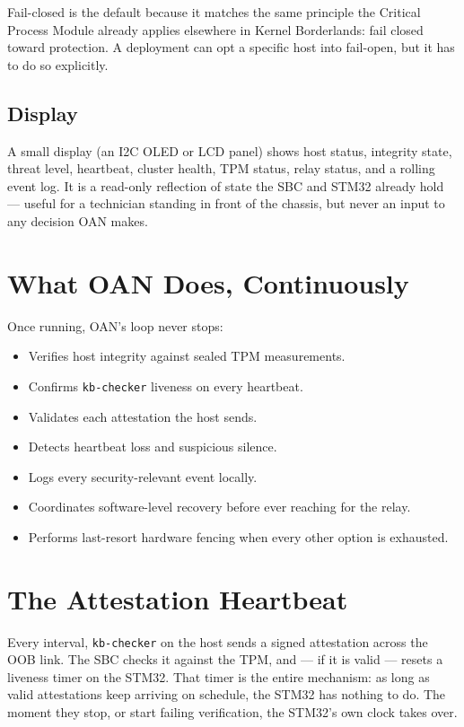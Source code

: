 \documentclass[11pt,a4paper]{article}
\begin{document}
Fail-closed is the default because it matches the same principle the
Critical Process Module already applies elsewhere in Kernel
Borderlands: fail closed toward protection. A deployment can opt a
specific host into fail-open, but it has to do so explicitly.

\subsection{Display}

A small display (an I2C OLED or LCD panel) shows host status,
integrity state, threat level, heartbeat, cluster health, TPM status,
relay status, and a rolling event log. It is a read-only reflection of
state the SBC and STM32 already hold --- useful for a technician
standing in front of the chassis, but never an input to any decision
OAN makes.

\section{What OAN Does, Continuously}

Once running, OAN's loop never stops:

\begin{itemize}
  \item Verifies host integrity against sealed TPM measurements.
  \item Confirms \texttt{kb-checker} liveness on every heartbeat.
  \item Validates each attestation the host sends.
  \item Detects heartbeat loss and suspicious silence.
  \item Logs every security-relevant event locally.
  \item Coordinates software-level recovery before ever reaching for
    the relay.
  \item Performs last-resort hardware fencing when every other option
    is exhausted.
\end{itemize}

\section{The Attestation Heartbeat}
\label{sec:heartbeat}

Every interval, \texttt{kb-checker} on the host sends a signed
attestation across the OOB link. The SBC checks it against the TPM,
and --- if it is valid --- resets a liveness timer on the STM32. That
timer is the entire mechanism: as long as valid attestations keep
arriving on schedule, the STM32 has nothing to do. The moment they
stop, or start failing verification, the STM32's own clock takes over.
\end{document}
